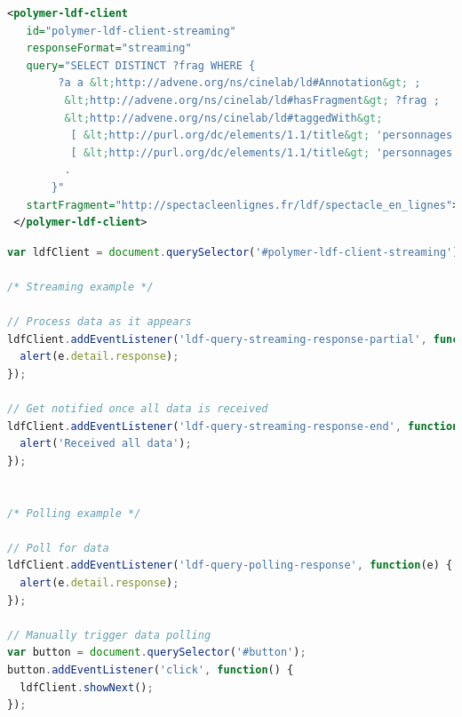 \documentclass[runningheads,a4paper]{llncs}
\begin{document}
\begin{lstlisting}[caption={Linked Data Fragments Web Component \texttt{<polymer-ldf-client>}},
  label=listing:ldfclient, language=XML,
  float=htb, showstringspaces=false, stringstyle=\color{gray},morekeywords={polymer,ldf,id,client,responseFormat,query,startFragment}]
<polymer-ldf-client
   id="polymer-ldf-client-streaming"
   responseFormat="streaming"
   query="SELECT DISTINCT ?frag WHERE {
        ?a a &lt;http://advene.org/ns/cinelab/ld#Annotation&gt; ;
         &lt;http://advene.org/ns/cinelab/ld#hasFragment&gt; ?frag ;
         &lt;http://advene.org/ns/cinelab/ld#taggedWith&gt;
          [ &lt;http://purl.org/dc/elements/1.1/title&gt; 'personnages: Margaret'],
          [ &lt;http://purl.org/dc/elements/1.1/title&gt; 'personnages: Grand Papa Pollitt'];
         .
       }"
   startFragment="http://spectacleenlignes.fr/ldf/spectacle_en_lignes">
 </polymer-ldf-client>
\end{lstlisting}

\begin{lstlisting}[caption={Obtaining streaming and polling data from the Linked Data Fragments Web Component \texttt{<polymer-ldf-client>}},
  label=listing:ldfclientcode, language=JavaScript,
  float=htb, showstringspaces=false, stringstyle=\color{gray},morekeywords={document,addEventListener,alert,querySelector,querySelectorAll}]
var ldfClient = document.querySelector('#polymer-ldf-client-streaming');

/* Streaming example */

// Process data as it appears
ldfClient.addEventListener('ldf-query-streaming-response-partial', function(e) {
  alert(e.detail.response);
});

// Get notified once all data is received
ldfClient.addEventListener('ldf-query-streaming-response-end', function() {
  alert('Received all data');
});


/* Polling example */

// Poll for data
ldfClient.addEventListener('ldf-query-polling-response', function(e) {
  alert(e.detail.response);
});

// Manually trigger data polling
var button = document.querySelector('#button');
button.addEventListener('click', function() {
  ldfClient.showNext();
});
\end{lstlisting}
\end{document}
